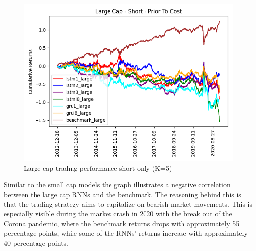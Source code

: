 \indent\newline 
\begin{figure}[H]
\centering
\includegraphics [scale=0.60,angle=360]{figures/cumulative_large_cap_return_no_cost_s.png}
\caption{Large cap trading performance short-only (K=5)}
\label{fig:shortlarge}
\end{figure} 
\indent\newline 
Similar to the small cap models the graph illustrates a negative correlation between the large cap RNNs and the benchmark. The reasoning behind this is that the trading strategy aims to capitalize on bearish market movements. This is especially visible during the market crash in 2020 with the break out of the Corona pandemic, where the benchmark returns drops with approximately 55 percentage points, while some of the RNNs' returns increase with approximately 40 percentage points.      
\indent\newline 
\begin{table}[ht]
\centering
{}
\caption{Comparison of trading performance short-only (K=5)}
\end{table}
